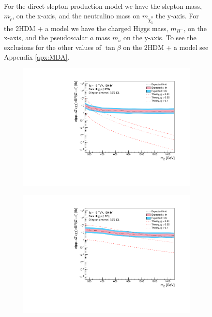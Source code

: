 \documentclass[12pt, a4paper]{book}
\begin{document}
\begin{figure}[!ht]
{      For the direct slepton production model we have the slepton mass, $m_{\tilde{\ell}}$, on the x-axis, and the neutralino mass on $m_{\tilde{\chi}_1^0}$ the y-axis. 
      For the 2HDM + a model we have the charged Higgs mass, $m_{H^-}$, on the x-axis, and the pseudoscalar $a$ mass $m_{a}$ on the y-axis. To see the exclusions for the other values of $\tan\beta$ on the 2HDM + a model see Appendix \ref{apx:MDA}.  
      }\label{fig:model_dep_excl}
\end{figure}
\begin{figure}[!ht]
	\centering
	\begin{subfigure}[b]{0.49\textwidth}
      \centering
      \includegraphics[width=1\textwidth]{Limits/DH_HDS/mass_exclusion_comb.pdf}
   \end{subfigure}
   \hfill
   \begin{subfigure}[b]{0.49\textwidth}
      \centering
      \includegraphics[width=1\textwidth]{Limits/DH_LDS/mass_exclusion_comb.pdf}

\end{subfigure}
\end{figure}
\end{document}
